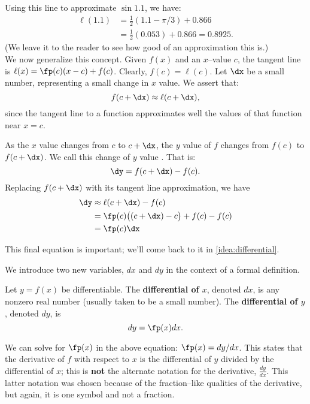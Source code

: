 Using this line to approximate $\sin 1.1$, we have:
\begin{align*}
	\ell(1.1) &= \frac12(1.1-\pi/3)+0.866 \\
					&= \frac12(0.053)+0.866 = 0.8925.
\end{align*}
(We leave it to the reader to see how good of an approximation this is.)\\

We now generalize this concept. Given $f(x)$ and an $x$--value $c$,  the tangent line is $\ell(x) = \fp(c)(x-c)+f(c)$. Clearly, $f(c) = \ell(c)$. Let $\dx$ be a small number, representing a small change in $x$ value. We assert that:
$$f(c+\dx) \approx \ell(c+\dx),$$ since the tangent line to a function approximates well the values of that function near $x=c$. 

As the $x$ value changes from $c$ to $c+\dx$, the $y$ value of $f$ changes from $f(c)$ to $f(c+\dx)$. We call this change of $y$ value \dy. That is:
$$\dy = f(c+\dx)-f(c).$$
Replacing $f(c+\dx)$ with its tangent line approximation, we have 
\begin{align} \dy &\approx \ell(c+\dx) - f(c) \notag\\
								&= \fp(c)\big((c+\dx)-c\big)+f(c) - f(c)\notag \\
								&=\fp(c)\dx		\label{eq:differential}
\end{align}

This final equation is important; we'll come back to it in \autoref{idea:differential}.

We introduce two new variables, $dx$ and $dy$ in the context of a formal definition. %

{Let $y=f(x)$ be differentiable. The \textbf{differential of $x$}, denoted $dx$, is any nonzero real number (usually taken to be a small number). The \textbf{differential of $y$}, denoted $dy$, is $$dy = \fp(x)dx.$$
}

We can solve for $\fp(x)$ in the above equation: $\fp(x) = dy/dx$. This states that the derivative of $f$ with respect to $x$ is the differential of $y$ divided by the differential of $x$; this is \textbf{not} the alternate notation for the derivative, $\frac{dy}{dx}$. This latter notation was chosen because of the fraction--like qualities of the derivative, but again, it is one symbol and not a fraction.

